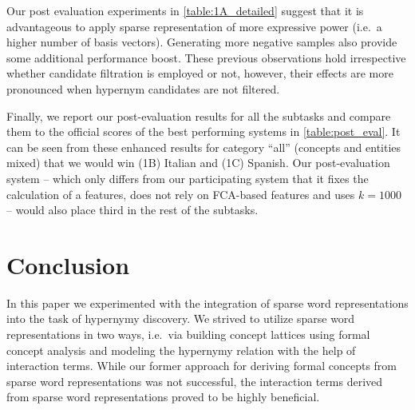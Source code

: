 \documentclass[11pt,a4paper]{article}
\begin{document}


Our post evaluation experiments in \autoref{table:1A_detailed} suggest that it 
is advantageous to apply sparse representation of more expressive power (i.e.~a 
higher number of basis vectors). Generating more negative samples also provide 
some additional performance boost. These previous observations hold 
irrespective whether candidate filtration is employed or not, however, their 
effects are more pronounced when hypernym candidates are not filtered.

Finally, we report our post-evaluation results for all the subtasks and compare
them to the official scores  of the best performing systems in 
\autoref{table:post_eval}. It can be seen from these enhanced results for 
category ``all'' (concepts and entities mixed) that we would win (1B) Italian 
and (1C) Spanish. Our post-evaluation system -- which only differs from our 
participating system that it fixes the calculation of a features, does 
not rely on FCA-based features and uses $k=1000$ -- would also place third in 
the rest of the subtasks.



\section{Conclusion}

In this paper we experimented with the integration of sparse word 
representations into the task of hypernymy discovery. We strived to utilize 
sparse word representations in two ways, i.e.~via building concept lattices 
using formal concept analysis and modeling the hypernymy relation with the help 
of interaction terms. While our former approach for deriving formal concepts 
from sparse word representations was not successful, the interaction terms 
derived from sparse word representations proved to be highly beneficial.




\end{document}
